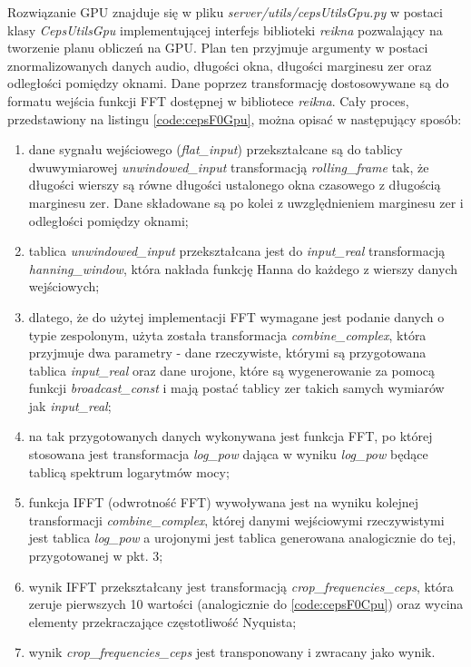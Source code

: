 \documentclass[12pt,a4paper,twoside]{mwart}
\begin{document}
Rozwiązanie GPU znajduje się w pliku \textit{server/utils/cepsUtilsGpu.py} w postaci klasy \textit{CepsUtilsGpu} implementującej interfejs biblioteki \textit{reikna} pozwalający na tworzenie planu obliczeń na GPU. Plan ten przyjmuje argumenty w postaci znormalizowanych danych audio, długości okna, długości marginesu zer oraz odległości pomiędzy oknami. Dane poprzez transformację dostosowywane są do formatu wejścia funkcji FFT dostępnej w bibliotece \textit{reikna}. Cały proces, przedstawiony na listingu \ref{code:cepsF0Gpu}, można opisać w następujący sposób:
\begin{enumerate}
  \item dane sygnału wejściowego (\textit{flat\_input}) przekształcane są do tablicy dwuwymiarowej \textit{unwindowed\_input} transformacją \textit{rolling\_frame} tak, że długości wierszy są równe długości ustalonego okna czasowego z długością marginesu zer. Dane składowane są po kolei z uwzględnieniem marginesu zer i odległości pomiędzy oknami;
  \item tablica \textit{unwindowed\_input} przekształcana jest do \textit{input\_real} transformacją \textit{hanning\_window}, która nakłada funkcję Hanna do każdego z wierszy danych wejściowych;
  \item dlatego, że do użytej implementacji FFT wymagane jest podanie danych o typie zespolonym, użyta została transformacja \textit{combine\_complex}, która przyjmuje dwa parametry - dane rzeczywiste, którymi są przygotowana tablica \textit{input\_real} oraz dane urojone, które są wygenerowanie za pomocą funkcji \textit{broadcast\_const} i mają postać tablicy zer takich samych wymiarów jak \textit{input\_real};
  \item na tak przygotowanych danych wykonywana jest funkcja FFT, po której stosowana jest transformacja \textit{log\_pow} dająca w wyniku \textit{log\_pow} będące tablicą spektrum logarytmów mocy;
  \item funkcja IFFT (odwrotność FFT) wywoływana jest na wyniku kolejnej transformacji \textit{combine\_complex}, której danymi wejściowymi rzeczywistymi jest tablica \textit{log\_pow} a urojonymi jest tablica generowana analogicznie do tej, przygotowanej w pkt. 3;
  \item wynik IFFT przekształcany jest transformacją \textit{crop\_frequencies\_ceps}, która zeruje pierwszych 10 wartości (analogicznie do \ref{code:cepsF0Cpu}) oraz wycina elementy przekraczające częstotliwość Nyquista;
  \item wynik \textit{crop\_frequencies\_ceps} jest transponowany i zwracany jako wynik.
\end{enumerate}
\end{document}
